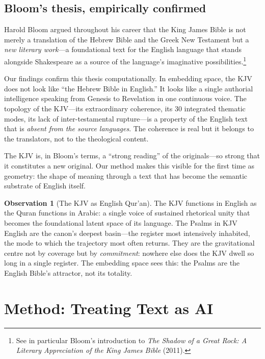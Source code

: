 \documentclass[11pt,a4paper]{article}
\theoremstyle{definition}
\newtheorem{observation}[definition]{Observation}
\begin{document}
\subsection{Bloom's thesis, empirically confirmed}

Harold Bloom argued throughout his career that the King James Bible is not merely a translation of the Hebrew Bible and the Greek New Testament but a \emph{new literary work}---a foundational text for the English language that stands alongside Shakespeare as a source of the language's imaginative possibilities.\footnote{See in particular Bloom's introduction to \emph{The Shadow of a Great Rock: A Literary Appreciation of the King James Bible} (2011).}

Our findings confirm this thesis computationally. In embedding space, the KJV does not look like ``the Hebrew Bible in English.'' It looks like a single authorial intelligence speaking from Genesis to Revelation in one continuous voice. The topology of the KJV---its extraordinary coherence, its 30 integrated thematic modes, its lack of inter-testamental rupture---is a property of the English text that is \emph{absent from the source languages}. The coherence is real but it belongs to the translators, not to the theological content.

The KJV is, in Bloom's terms, a ``strong reading'' of the originals---so strong that it constitutes a new original. Our method makes this visible for the first time as geometry: the shape of meaning through a text that has become the semantic substrate of English itself.

\begin{observation}[The KJV as English Qur'an]
The KJV functions in English as the Quran functions in Arabic: a single voice of sustained rhetorical unity that becomes the foundational latent space of its language. The Psalms in KJV English are the canon's deepest basin---the register most intensively inhabited, the mode to which the trajectory most often returns. They are the gravitational centre not by coverage but by \emph{commitment}: nowhere else does the KJV dwell so long in a single register. The embedding space sees this: the Psalms are the English Bible's attractor, not its totality.
\end{observation}


\section{Method: Treating Text as AI}
\end{document}
